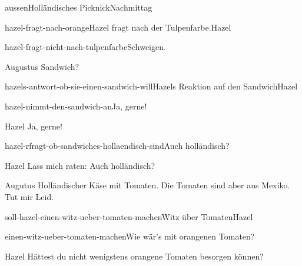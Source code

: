 \documentclass[12pt]{article}
\begin{document}
\begin{scene}{aussen}{Holländisches Picknick}{Nachmittag}
\begin{decision}{hazel-fragt-nach-orange}{\gls{Hazel} fragt nach der Tulpenfarbe.}{Hazel}
            \begin{option}{hazel-fragt-nicht-nach-tulpenfarbe}{Schweigen.}
            \end{option}
        \end{decision}


        \begin{dialog}{Augustus}
            Sandwich?
        \end{dialog}

        \begin{decision}{hazels-antwort-ob-sie-einen-sandwich-will}{\gls{Hazel}s Reaktion auf den Sandwich}{Hazel}
            \begin{option}{hazel-nimmt-den-sandwich-an}{Ja, gerne!}
                \begin{dialog}{Hazel}
                    Ja, gerne!
                \end{dialog}
            \end{option}

            \begin{option}{hazel-rfragt-ob-sandwiches-hollaendisch-sind}{Auch holländisch?}
                \begin{dialog}{Hazel}
                    Lass mich raten: Auch holländisch?
                \end{dialog}
            \end{option}
        \end{decision}

        \begin{dialog}{Augutus}
            Holländischer Käse mit Tomaten. Die Tomaten sind aber aus Mexiko. Tut mir Leid.
        \end{dialog}


        \begin{decision}{soll-hazel-einen-witz-ueber-tomaten-machen}{Witz über Tomaten}{Hazel}
            \begin{option}{einen-witz-ueber-tomaten-machen}{Wie wär's mit orangenen Tomaten?}
                \begin{dialog}{Hazel}
                    Hättest du nicht wenigstens orangene Tomaten besorgen können?
                \end{dialog}

            \end{option}


\end{decision}
\end{scene}
\end{document}
